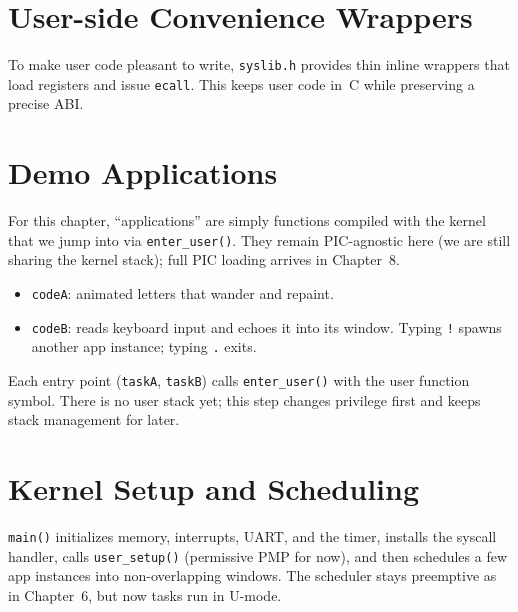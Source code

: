 \section{User-side Convenience Wrappers}

To make user code pleasant to write, \texttt{syslib.h} provides thin inline wrappers that load registers and issue \texttt{ecall}.  This keeps user code in~C while preserving a precise ABI.

\begin{figure}[H]
\centering

\end{figure}

\section{Demo Applications}

For this chapter, “applications” are simply functions compiled with the kernel that we jump into via \texttt{enter\_user()}.  They remain PIC-agnostic here (we are still sharing the kernel stack); full PIC loading arrives in Chapter~8.

\begin{itemize}
  \item \texttt{codeA}: animated letters that wander and repaint.
  \item \texttt{codeB}: reads keyboard input and echoes it into its window.  Typing \texttt{!} spawns another app instance; typing \texttt{.} exits.
\end{itemize}

\begin{figure}[H]
\centering

\end{figure}

Each entry point (\texttt{taskA}, \texttt{taskB}) calls \texttt{enter\_user()} with the user function symbol.  There is no user stack yet; this step changes privilege first and keeps stack management for later.

\section{Kernel Setup and Scheduling}

\texttt{main()} initializes memory, interrupts, UART, and the timer, installs the syscall handler, calls \texttt{user\_setup()} (permissive PMP for now), and then schedules a few app instances into non-overlapping windows.  The scheduler stays preemptive as in Chapter~6, but now tasks run in U-mode.

